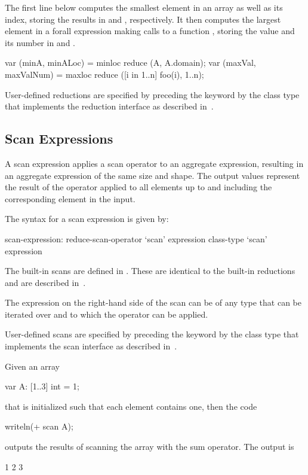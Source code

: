 \begin{example}
The first line below computes the smallest element in an array
 as well as its index, storing the results in  and
, respectively.  It then computes the largest element in
a forall expression making calls to a function , storing
the value and its number in  and .
\begin{chapel}
var (minA, minALoc) = minloc reduce (A, A.domain); 
var (maxVal, maxValNum) = maxloc reduce ([i in 1..n] foo(i), 1..n);
\end{chapel}
\end{example}

User-defined reductions are specified by preceding the
keyword  by the class type that implements the reduction
interface as described in~.

\subsection{Scan Expressions}
\label{scan}

A scan expression applies a scan operator to an aggregate expression,
resulting in an aggregate expression of the same size and shape.  The
output values represent the result of the operator applied to all
elements up to and including the corresponding element in the input.

The syntax for a scan expression is given by:
\begin{syntax}
scan-expression:
  reduce-scan-operator `scan' expression
  class-type `scan' expression
\end{syntax}

The built-in scans are defined in .  These
are identical to the built-in reductions and are described
in~.

The expression on the right-hand side of the scan can be of any type
that can be iterated over and to which the operator can be applied.

User-defined scans are specified by preceding the keyword 
by the class type that implements the scan interface as described
in~.

\begin{example}
Given an array
\begin{chapel}
var A: [1..3] int = 1;
\end{chapel}
that is initialized such that each element contains one, then the code
\begin{chapel}
writeln(+ scan A);
\end{chapel}
outputs the results of scanning the array with the sum operator.  The
output is
\begin{chapel}
1 2 3
\end{chapel}
\end{example}

